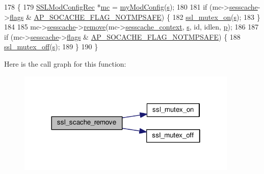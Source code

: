 \begin{DoxyCode}
178 \{
179     \hyperlink{structSSLModConfigRec}{SSLModConfigRec} *\hyperlink{group__APR__Util__MC_ga1cf8c9d89cfb411f224cae715e8c2aaa}{mc} = \hyperlink{group__MOD__SSL__PRIVATE_ga94fd702ebef715ed37309b2be90c68e8}{myModConfig}(\hyperlink{group__APACHE__CORE__LISTEN_ga9359ed159c8b295541e3770172d34550}{s});
180 
181     \textcolor{keywordflow}{if} (mc->\hyperlink{structSSLModConfigRec_adb8e8600966e26396f91b022e07a492c}{sesscache}->\hyperlink{structap__socache__provider__t_a8cb231295671689e9757af48635c9086}{flags} & \hyperlink{group__AP__SOCACHE_ga770558b0e3bdd232891e4bdbd6a04534}{AP\_SOCACHE\_FLAG\_NOTMPSAFE}) \{
182         \hyperlink{group__MOD__SSL__PRIVATE_gaf763e5ab5e24eb3db0cab1b3e72b82fa}{ssl\_mutex\_on}(\hyperlink{group__APACHE__CORE__LISTEN_ga9359ed159c8b295541e3770172d34550}{s});
183     \}
184 
185     mc->\hyperlink{structSSLModConfigRec_adb8e8600966e26396f91b022e07a492c}{sesscache}->\hyperlink{structap__socache__provider__t_ab64b59f1a22f847f2c73fc73ffa43b88}{remove}(mc->\hyperlink{structSSLModConfigRec_a7e21a98b4cf1958c6eb48294bc2045f9}{sesscache\_context}, 
      \hyperlink{group__APACHE__CORE__LISTEN_ga9359ed159c8b295541e3770172d34550}{s}, \textcolor{keywordtype}{id}, idlen, \hyperlink{group__APACHE__CORE__MPM_ga5cd91701e5c167f2b1a38e70ab57817e}{p});
186 
187     \textcolor{keywordflow}{if} (mc->\hyperlink{structSSLModConfigRec_adb8e8600966e26396f91b022e07a492c}{sesscache}->\hyperlink{structap__socache__provider__t_a8cb231295671689e9757af48635c9086}{flags} & \hyperlink{group__AP__SOCACHE_ga770558b0e3bdd232891e4bdbd6a04534}{AP\_SOCACHE\_FLAG\_NOTMPSAFE}) \{
188         \hyperlink{group__MOD__SSL__PRIVATE_ga9517e266a108cd6d10d0795eb781000f}{ssl\_mutex\_off}(\hyperlink{group__APACHE__CORE__LISTEN_ga9359ed159c8b295541e3770172d34550}{s});
189     \}
190 \}
\end{DoxyCode}


Here is the call graph for this function\+:
\nopagebreak
\begin{figure}[H]
\begin{center}
\leavevmode
\includegraphics[width=298pt]{group__MOD__SSL__PRIVATE_ga6084ccd4ecd267bb63679204f6a2d770_cgraph}
\end{center}
\end{figure}




